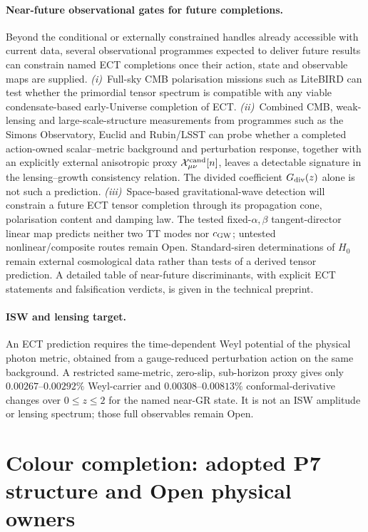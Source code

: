 \documentclass[11pt,a4paper]{article}
\begin{document}
\paragraph{Near-future observational gates for future completions.}
Beyond the conditional or externally constrained handles already accessible
with current data, several observational programmes expected to deliver
future results can constrain named ECT completions once their action, state
and observable maps are supplied.
\emph{(i)}~Full-sky CMB polarisation missions such as LiteBIRD can test
whether the primordial
tensor spectrum is compatible with any viable condensate-based
early-Universe completion of ECT\@.
\emph{(ii)}~Combined CMB, weak-lensing and large-scale-structure
measurements from programmes such as the Simons Observatory, Euclid and
Rubin/LSST can probe
whether a completed action-owned scalar--metric background and perturbation
response, together with an explicitly external anisotropic proxy
$\mathcal X^{\rm cand}_{\mu\nu}[n]$, leaves a detectable signature in the
lensing--growth consistency relation.  The divided coefficient
$G_{\rm div}(z)$ alone is not such a prediction.
\emph{(iii)}~Space-based gravitational-wave detection will constrain a future ECT tensor completion through its propagation cone, polarisation content and damping law.  The tested fixed-$\alpha,\beta$ tangent-director linear map predicts neither two TT modes nor $c_{\rm GW}$; untested nonlinear/composite routes remain Open.  Standard-siren determinations of $H_0$ remain external cosmological data rather than tests of a derived tensor prediction.
A detailed table of near-future discriminants, with explicit
ECT statements and falsification verdicts, is given in the
technical preprint.

\paragraph{ISW and lensing target.}
An ECT prediction requires the time-dependent Weyl potential of the physical
photon metric, obtained from a gauge-reduced perturbation action on the same
background.  A restricted same-metric, zero-slip, sub-horizon proxy gives only
$0.00267$--$0.00292\%$ Weyl-carrier and $0.00308$--$0.00813\%$
conformal-derivative changes over $0\le z\le2$ for the named near-GR state.
It is not an ISW amplitude or lensing spectrum; those full observables remain
Open.

\section{Colour completion: adopted P7 structure and Open physical owners}
\label{sec:pop_colour}
\end{document}
